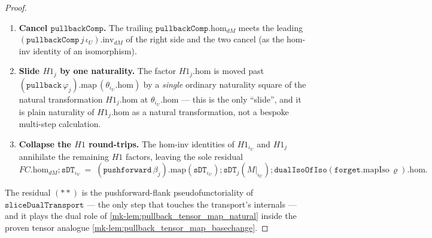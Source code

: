 \begin{proof}
\begin{enumerate}
        \mathbin{;} ._{dM}\),
      regrouping the \(H1_{\iota_U}\) factor across the pushforward middle functor on the source flank
      (\(\mathtt{pullbackComp}\), \ref{mk-lem:presheafofmodules_pullbackcomp}).
    \item \textbf{Cancel \(\mathtt{pullbackComp}\).} The trailing
      \(\mathtt{pullbackComp}.\mathrm{hom}_{dM}\) meets the leading
      \((\mathtt{pullbackComp}\,j\,\iota_U).\mathrm{inv}_{dM}\) of the right side and the two cancel
      (as the hom-inv identity of an isomorphism).
    \item \textbf{Slide \(H1_j\) by one naturality.} The factor \(H1_j.\mathrm{hom}\) is moved past
      \((\mathtt{pullback}\,\varphi_j).\mathrm{map}\,(\theta_{\iota_U}.\mathrm{hom})\) by a \emph{single}
      ordinary naturality square of the natural transformation \(H1_j.\mathrm{hom}\) at
      \(\theta_{\iota_U}.\mathrm{hom}\) --- this is the only ``slide'', and it is plain
      naturality of \(H1_j.\mathrm{hom}\) as a natural transformation, not a bespoke multi-step calculation.
    \item \textbf{Collapse the \(H1\) round-trips.} The hom-inv identities of
      \(H1_{\iota_U}\) and \(H1_j\) annihilate the remaining \(H1\) factors, leaving the sole residual
      \begin{equation}
        FC.\mathrm{hom}_{dM} \mathbin{;} \mathtt{sDT}_{\iota_V}
          \;=\;
        (\mathtt{pushforward}\,\beta_j).\mathrm{map}(\mathtt{sDT}_{\iota_U})
          \mathbin{;} \mathtt{sDT}_j(M|_{\iota_U})
          \mathbin{;} \mathtt{dualIsoOfIso}(\mathtt{forget}.\mathrm{mapIso}\,\varrho).\mathrm{hom}.
        \tag{$**$}
      \end{equation}
  \end{enumerate}
  The residual \((**)\) is the pushforward-flank pseudofunctoriality of
  \(\mathtt{sliceDualTransport}\) --- the only step that touches the transport's internals --- and it
  plays the dual role of \ref{mk-lem:pullback_tensor_map_natural} inside the proven tensor analogue
  \ref{mk-lem:pullback_tensor_map_basechange}.


\end{proof}
